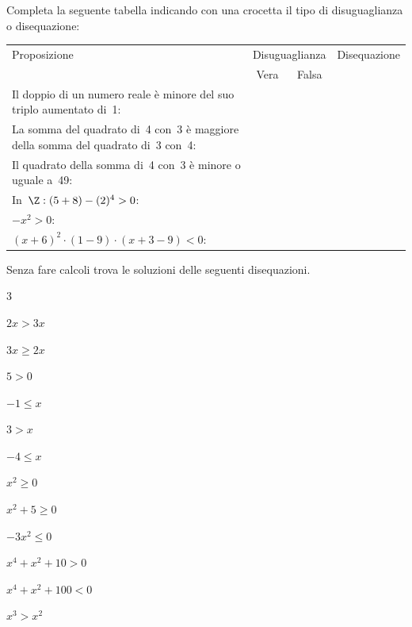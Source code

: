 \begin{esercizio}
\label{ese:dis_9}
Completa la seguente tabella indicando con una crocetta il tipo di
disuguaglianza o disequazione:

\begin{tabularx}{.9\textwidth}{X|c|c|c|}
\toprule
Proposizione&\multicolumn{2}{c}{Disuguaglianza}& Disequazione\\
& Vera & Falsa & \\
\midrule
Il doppio di un numero reale è minore del suo triplo aumentato di~1: & & & \\
\midrule
La somma del quadrato di~4 con~3 è maggiore della somma del quadrato di~3 
con~4: & & &\\
\midrule
Il quadrato della somma di~4 con~3 è minore o uguale a~49: & & & \\
\midrule
In~\(\Z:(5+8)-(2)^{4}>0\): & & & \\
\midrule
\(-x^{2}>0\): & & & \\
\midrule
\((x+6)^{2}\cdot (1-9)\cdot (x+3-9)<0\): & & & \\
\bottomrule
\end{tabularx}
\end{esercizio}


\begin{esercizio}
\label{ese:dis_10}
Senza fare calcoli trova le soluzioni delle seguenti disequazioni.
\begin{htmulticols}{3}
\begin{enumeratea}
\item \(2x>3x\)
\item \(3x\ge2x\)
\item \(5>0\)
\item \(-1\leqslant x\)
\item \(3>x\)
\item \(-4\leqslant x\)
\item \(x^2\geqslant 0\)
\item \(x^2+5\geqslant 0\)
\item \(-3x^2\leqslant 0\)
\item \(x^{4}+x^{2}+10>0\)
\item \(x^{4}+x^{2}+100<0\)
\item \(x^3>x^2\)
\end{enumeratea}
\end{htmulticols}
\end{esercizio}

